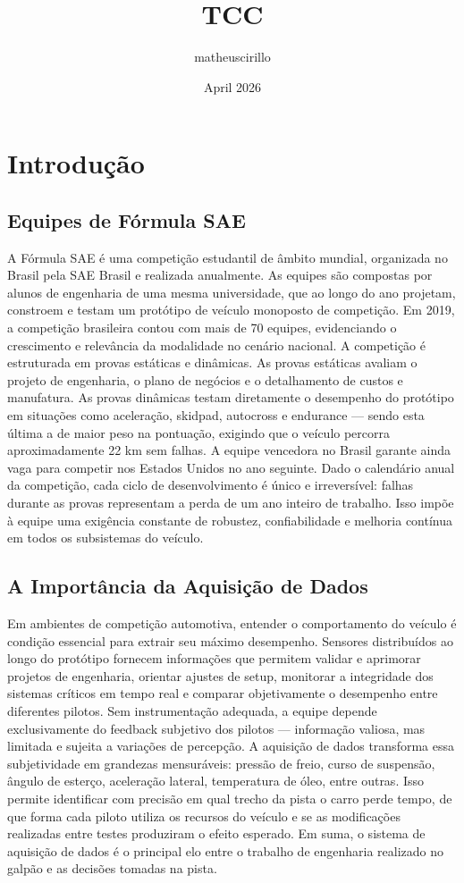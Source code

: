 \documentclass{article}
\title{TCC}
\author{matheuscirillo }
\date{April 2026}
\begin{document}
    \maketitle

    \section{Introdução}
    \subsection{Equipes de Fórmula SAE}
    A Fórmula SAE é uma competição estudantil de âmbito mundial, organizada no Brasil
    pela SAE Brasil e realizada anualmente. As equipes são compostas por alunos
    de engenharia de uma mesma universidade, que ao longo do ano projetam,
    constroem e testam um protótipo de veículo monoposto de competição. Em 2019,
    a competição brasileira contou com mais de 70 equipes, evidenciando o crescimento
    e relevância da modalidade no cenário nacional. A competição é estruturada
    em provas estáticas e dinâmicas. As provas estáticas avaliam o projeto de engenharia,
    o plano de negócios e o detalhamento de custos e manufatura. As provas dinâmicas
    testam diretamente o desempenho do protótipo em situações como aceleração,
    skidpad, autocross e endurance — sendo esta última a de maior peso na pontuação,
    exigindo que o veículo percorra aproximadamente 22 km sem falhas. A equipe vencedora
    no Brasil garante ainda vaga para competir nos Estados Unidos no ano seguinte.
    Dado o calendário anual da competição, cada ciclo de desenvolvimento é único
    e irreversível: falhas durante as provas representam a perda de um ano
    inteiro de trabalho. Isso impõe à equipe uma exigência constante de robustez,
    confiabilidade e melhoria contínua em todos os subsistemas do veículo.
    \subsection{A Importância da Aquisição de Dados}
    Em ambientes de competição automotiva, entender o comportamento do veículo é
    condição essencial para extrair seu máximo desempenho. Sensores distribuídos
    ao longo do protótipo fornecem informações que permitem validar e aprimorar projetos
    de engenharia, orientar ajustes de setup, monitorar a integridade dos sistemas
    críticos em tempo real e comparar objetivamente o desempenho entre diferentes
    pilotos. Sem instrumentação adequada, a equipe depende exclusivamente do feedback
    subjetivo dos pilotos — informação valiosa, mas limitada e sujeita a
    variações de percepção. A aquisição de dados transforma essa subjetividade em
    grandezas mensuráveis: pressão de freio, curso de suspensão, ângulo de
    esterço, aceleração lateral, temperatura de óleo, entre outras. Isso permite
    identificar com precisão em qual trecho da pista o carro perde tempo, de que
    forma cada piloto utiliza os recursos do veículo e se as modificações realizadas
    entre testes produziram o efeito esperado. Em suma, o sistema de aquisição de
    dados é o principal elo entre o trabalho de engenharia realizado no galpão e
    as decisões tomadas na pista.
\end{document}
